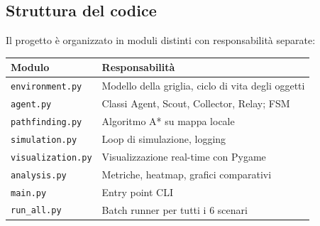 \subsection{Struttura del codice}

Il progetto è organizzato in moduli distinti con responsabilità separate:

\begin{center}
\begin{tabular}{ll}
\toprule
\textbf{Modulo} & \textbf{Responsabilità} \\
\midrule
\texttt{environment.py}   & Modello della griglia, ciclo di vita degli oggetti \\
\texttt{agent.py}         & Classi Agent, Scout, Collector, Relay; FSM \\
\texttt{pathfinding.py}   & Algoritmo A* su mappa locale \\
\texttt{simulation.py}    & Loop di simulazione, logging \\
\texttt{visualization.py} & Visualizzazione real-time con Pygame \\
\texttt{analysis.py}      & Metriche, heatmap, grafici comparativi \\
\texttt{main.py}          & Entry point CLI \\
\texttt{run\_all.py}      & Batch runner per tutti i 6 scenari \\
\bottomrule
\end{tabular}
\end{center}
